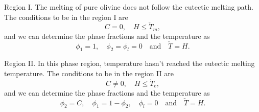 \documentclass[usenames,dvipsnames,letterpaper,landscape,final]{slides}
\theoremstyle{definition}
\begin{document}
\begin{myslide}

Region I.  The melting of pure olivine does not follow the eutectic
melting path. The conditions to be in the region I are
\begin{equation*}
		  C = 0,  \quad H \leq \check{T}_m,
\end{equation*}
and we can determine the phase fractions and the temperature as
\begin{equation*}
\phi_{1} = 1, \quad \phi_{2} = \phi_l = 0 \quad \text{and} 
		  \quad \check{T} = H.
\end{equation*}

\vspace{0.5cm}

Region II. 
In this phase region, temperature hasn't reached the eutectic melting temperature.
The conditions to be in the region II are
\begin{equation*}
		  C \neq 0, \quad H \leq \check{T}_e,
\end{equation*}
and we can determine the phase fractions and the temperature as
\begin{equation*}
\phi_{2} = C, \quad \phi_1 = 1-\phi_2,
		  \quad \phi_l = 0 \quad \text{and} \quad 
		  \check{T} = H .
\end{equation*}

\end{myslide}
\end{document}
